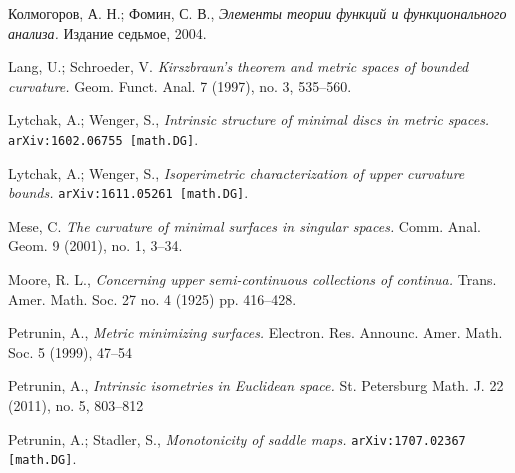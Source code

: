 \documentclass{article}
\begin{document}
\begin{thebibliography}{52}
\begin{otherlanguage}{russian}
Колмогоров, А. Н.;
Фомин, С. В.,
\textit{Элементы теории функций и функционального анализа.}
Издание седьмое, 2004.
\end{otherlanguage}

 Lang, U.; Schroeder, V.
\textit{Kirszbraun's theorem and metric spaces of bounded curvature.}
Geom. Funct. Anal. 7 (1997), no. 3, 535--560. 





Lytchak, A.; Wenger, S.,
\textit{Intrinsic structure of minimal discs in metric spaces.} 
\texttt{arXiv:1602.06755 [math.DG]}.


 Lytchak, A.; Wenger, S.,  
\textit{Isoperimetric  characterization  of  upper  curvature bounds.}
\texttt{arXiv:1611.05261 [math.DG]}.

 Mese, C.
\textit{The curvature of minimal surfaces in singular spaces.}
Comm. Anal. Geom. 9 (2001), no. 1, 3--34. 

Moore, R. L.,
\textit{Concerning upper semi-continuous collections of continua.}
Trans. Amer. Math. Soc. 27 no. 4 (1925) pp. 416--428.

 Petrunin, A.,
\textit{Metric minimizing surfaces.}
Electron. Res. Announc. Amer. Math. Soc. 5 (1999), 47--54 

 Petrunin, A.,
\textit{Intrinsic isometries in Euclidean space.}
St. Petersburg Math. J. 22 (2011), no. 5, 803--812 

 Petrunin, A.; Stadler, S.,
\textit{Monotonicity of saddle maps.} 
\texttt{arXiv:1707.02367 [math.DG]}.


\end{thebibliography}
\end{document}
